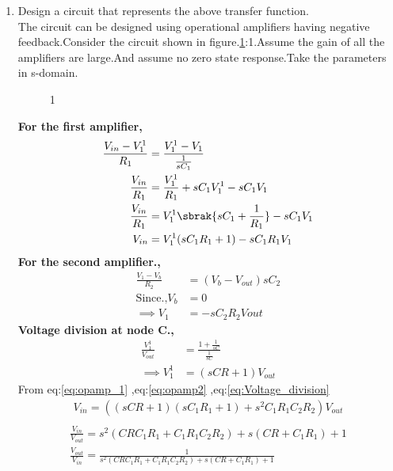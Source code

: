 \begin{enumerate}[label=\arabic*.,ref=\theenumi]
\item Design a circuit that represents the above transfer function.\\
\solution The circuit can be designed using  operational amplifiers having negative feedback.Consider the circuit shown in figure.\ref{fig:circuit_design}:1.Assume the gain of all the amplifiers are large.And assume no zero state response.Take the parameters in s-domain.\\
\begin{figure}[!hbt]
	\begin{center}
			\resizebox{\columnwidth}{!}{}
	\end{center}
\caption{1}
\label{fig:circuit_design}
\end{figure}
\textbf{For the first amplifier,}\\
\begin{align}
    \frac{V_{in}-V_1^1}{R_1} &= \frac{V_1^1-V_1}{\frac{1}{sC_1}}\\
    \frac{V_{in}}{R_1} &= \frac{V_1^1}{R_1}+sC_1V_1^1 - sC_1V_1 \\
    \frac{V_{in}}{R_1} &= V_1^1\sbrak{sC_1+\frac{1}{R_1}}-sC_1V_1\\
    V_{in} &= V_1^1(sC_1R_1+1)-sC_1R_1V_1\label{eq:opamp_1}
\end{align}
\textbf{For the second amplifier.,}
\begin{align}
    \frac{V_1-V_b}{R_2} &= (V_b-V_{out})sC_2\\
    \text{Since.,} V_b &= 0\\
    \implies V_1 &= -sC_2R_2V{out}\label{eq:opamp2}
\end{align}
\textbf{Voltage division at node C.,}\\
\begin{align}
    \frac{V_1^1}{V_{out}} &= \frac{1+\frac{1}{sC}}{\frac{1}{sC}}\\
    \implies V_1^1 &= (sCR+1)V_{out}\label{eq:Voltage_division}
\end{align}
From eq:\eqref{eq:opamp_1} ,eq:\eqref{eq:opamp2} ,eq:\eqref{eq:Voltage_division}
\begin{align}
     V_{in} = ((sCR+1)(sC_1R_1+1)+s^2C_1R_1C_2R_2)V_{out}\\
\end{align}
 \begin{multline}
   \frac{V_{in}}{V_{out}}=s^2(CRC_1R_1+C_1R_1C_2R_2) + s(CR+C_1R_1) + 1\\
   \frac{V_{out}}{V_{in}}=\frac{1}{s^2(CRC_1R_1+C_1R_1C_2R_2) + s(CR+C_1R_1) + 1} \label{eq:Circuit_trans_func}

\end{multline}
\end{enumerate}
